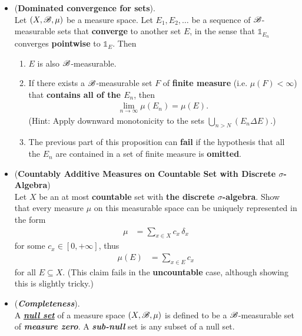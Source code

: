 \documentclass[11pt]{article}
\begin{document}
\begin{itemize}
\item \begin{proposition} (\textbf{Dominated convergence for sets}). \citep{tao2011introduction} \\
Let $(X, {\mathscr B}, \mu)$ be a measure space. Let $E_1, E_2, \ldots $ be a sequence of ${\mathscr B}$-measurable sets that \textbf{converge} to another set $E$, in the sense that $\mathds{1}_{E_n}$ converges \textbf{pointwise} to $\mathds{1}_{E}$. Then 
\begin{enumerate}
\item $E$ is also ${\mathscr B}$-measurable.
\item If there exists a ${\mathscr B}$-measurable set $F$ of \textbf{finite measure} (i.e. $\mu(F) < \infty$) that \textbf{contains all of the $E_n$}, then
\begin{align*}
\lim\limits_{n \rightarrow \infty} \mu(E_n) = \mu(E). 
\end{align*}
(Hint: Apply downward monotonicity to the sets $\bigcup_{n>N}(E_n \Delta E)$.)
\item The previous part of this proposition can \textbf{fail} if the hypothesis that all the $E_n$ are contained in a set of finite measure is \textbf{omitted}.
\end{enumerate}
\end{proposition}

\item \begin{exercise}  (\textbf{Countably Additive Measures on Countable Set with Discrete $\sigma$-Algebra})\\
Let $X$ be an at most \textbf{countable} set with \textbf{the discrete $\sigma$-algebra}. Show that every measure $\mu$ on this measurable space can be uniquely represented in the form
\begin{align*}
\mu &= \sum_{x \in X}c_x \, \delta_x
\end{align*} for some $c_x \in [0, +\infty]$, thus
\begin{align*}
\mu(E) &= \sum_{x \in E}c_x
\end{align*} for all $E \subseteq X$. (This claim fails in the \textbf{uncountable} case, although showing this is slightly tricky.)
\end{exercise}

\item \begin{definition}(\emph{\textbf{Completeness}}). \citep{tao2011introduction} \\
A \underline{\emph{\textbf{null set}}} of a measure space $(X, {\mathscr B}, \mu)$ is defined to be a ${\mathscr B}$-measurable set of \emph{\textbf{measure zero}}. A \emph{\textbf{sub-null}} set is any subset of a null set. 


\end{definition}
\end{itemize}
\end{document}
